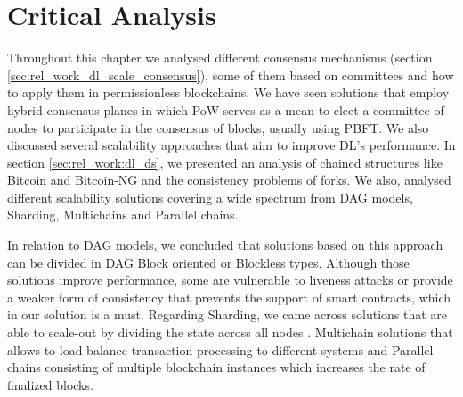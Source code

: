 \section{Critical Analysis}
\label{sec:rel_work:critical_analysis}

Throughout this chapter we analysed different consensus mechanisms (section \ref{sec:rel_work_dl_scale_consensus}), some of them based on committees and how to apply them in permissionless blockchains. We have seen solutions that employ hybrid consensus planes in which \gls{PoW} serves as a mean to elect a committee of nodes to participate in the consensus of blocks, usually using \gls{PBFT}. We also discussed several scalability approaches that aim to improve \gls{DL}'s performance. In section \ref{sec:rel_work:dl_ds}, we presented an analysis of chained structures like Bitcoin \cite{bitcoin} and Bitcoin-NG \cite{bitcoin-ng} and the consistency problems of forks. We also, analysed different scalability solutions covering a wide spectrum from \gls{DAG} models, Sharding, Multichains and Parallel chains.

In relation to \gls{DAG} models, we concluded that solutions based on this approach can be divided in \gls{DAG} Block oriented or Blockless types. Although those solutions improve performance, some are vulnerable to liveness attacks \cite{block_dag, phantom_dag} or provide a weaker form of consistency \cite{spectre_dag} that prevents the support of smart contracts, which in our solution is a must. Regarding Sharding, we came across solutions that are able to scale-out by dividing the state across all nodes \cite{omniledger, rapid_chain}. Multichain solutions that allows to load-balance transaction processing to different systems and Parallel chains consisting of multiple blockchain instances which increases the rate of finalized blocks.


